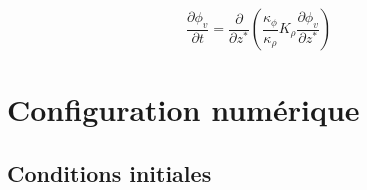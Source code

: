 \documentclass[a4paper,12pt]{article}
\begin{document}
        \begin{equation}
            \frac{\partial\phi_v}{\partial t} = \frac{\partial}{\partial z^*} (\frac{\kappa_{\phi}}{\kappa_{\rho}}K_{\rho}\frac{\partial\phi_v}{\partial z^*})
        \end{equation}
        
\section{Configuration numérique}
    
    \subsection{Conditions initiales}
    
\end{document}
